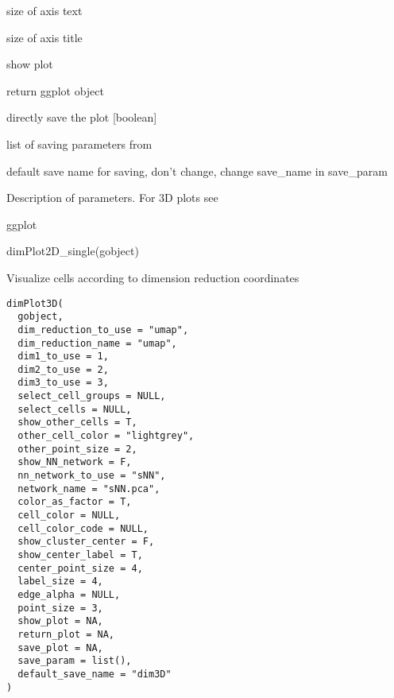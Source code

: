 \documentclass[a4paper]{book}
\begin{document}
\begin{Arguments}
\begin{ldescription}
\item[\code{axis\_text}] size of axis text

\item[\code{axis\_title}] size of axis title

\item[\code{show\_plot}] show plot

\item[\code{return\_plot}] return ggplot object

\item[\code{save\_plot}] directly save the plot [boolean]

\item[\code{save\_param}] list of saving parameters from 

\item[\code{default\_save\_name}] default save name for saving, don't change, change save\_name in save\_param
\end{ldescription}
\end{Arguments}
%
\begin{Details}\relax
Description of parameters. For 3D plots see 
\end{Details}
%
\begin{Value}
ggplot
\end{Value}
%
\begin{Examples}
\begin{ExampleCode}
    dimPlot2D_single(gobject)
\end{ExampleCode}
\end{Examples}
%
\begin{Description}\relax
Visualize cells according to dimension reduction coordinates
\end{Description}
%
\begin{Usage}
\begin{verbatim}
dimPlot3D(
  gobject,
  dim_reduction_to_use = "umap",
  dim_reduction_name = "umap",
  dim1_to_use = 1,
  dim2_to_use = 2,
  dim3_to_use = 3,
  select_cell_groups = NULL,
  select_cells = NULL,
  show_other_cells = T,
  other_cell_color = "lightgrey",
  other_point_size = 2,
  show_NN_network = F,
  nn_network_to_use = "sNN",
  network_name = "sNN.pca",
  color_as_factor = T,
  cell_color = NULL,
  cell_color_code = NULL,
  show_cluster_center = F,
  show_center_label = T,
  center_point_size = 4,
  label_size = 4,
  edge_alpha = NULL,
  point_size = 3,
  show_plot = NA,
  return_plot = NA,
  save_plot = NA,
  save_param = list(),
  default_save_name = "dim3D"
)
\end{verbatim}
\end{Usage}
\end{document}
